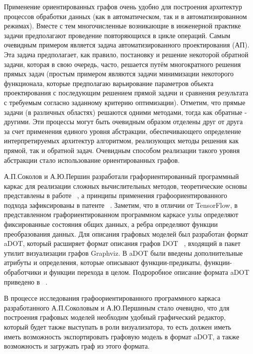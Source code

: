 Применение ориентированных графов очень удобно для построения архитектур процессов обработки данных (как в автоматическом, так и в автоматизированном режимах). Вместе с тем многочисленные возникающие в инженерной практике задачи предполагают проведение повторяющихся в цикле операций. Самым очевидным примером является задача автоматизированного проектирования (АП). Эта задача предполагает, как правило, постановку и решение некоторой обратной задачи, которая в свою очередь, часто, решается путём многократного решения прямых задач (простым примером являются задачи минимизации некоторого функционала, которые предполагаю варьирование параметров объекта проектирования с последующим решением прямой задачи и сравнения результата с требуемым согласно заданному критерию оптимизации). Отметим, что прямые задачи (в различных областях) решаются одними методами, тогда как обратные - другими. Эти процессы могут быть очевидным образом отделены друг от друга за счет применения единого уровня абстракции, обеспечивающего определение интерпретируемых архитектур  алгоритмом, реализующих методы решения как прямой, так и обратной задач. Очевидным способом реализации такого уровня абстракции стало использование ориентированных графов.

А.П.Соколов и А.Ю.Першин разработали графориентированный программный каркас для реализации сложных вычислительных методов, теоретические основы представлены в работе ~\cite{SokPersh2018GBSE}, а принципы применения графоориентированного подхода зафиксированы в патенте ~\cite{patentRU2681408}. Заметим, что в отличии от TensorFlow, в представленном графориентированном программном каркасе узлы определяют фиксированные состояния общих данных, а ребра определяют функции преобразования данных. Для описания графовых моделей был разработан формат aDOT, который расширяет формат описания графов DOT ~\cite{GraphsDOT}, входящий в пакет утилит визуализации графов Graphviz. В aDOT были введены дополнительные атрибуты и определения, которые описывают функции-предикаты, функции-обработчики и функции перехода в целом. Подроробное описание формата aDOT приведено в ~\cite{SokADOT}.

В процессе исследования графоориентированного программного каркаса разработанного А.П.Соколовым и А.Ю.Першиным стало очевидно, что для построения графовых моделей необходим удобный графический редактор, который будет также выступать в роли визуализатора, то есть должен иметь иметь возможность экспортировать графовую модель в формат aDOT, а также возможность и загружать граф из этого формата.

